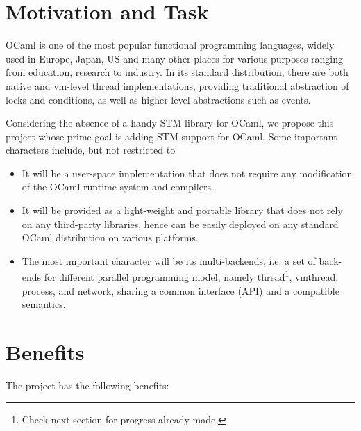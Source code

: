 \documentclass{article}
\begin{document}
\section{Motivation and Task}

OCaml \cite{OCaml} is one of the most popular functional programming languages,
widely used in Europe, Japan, US and many other places for various purposes
ranging from education, research to industry. In its standard distribution,
there are both native and vm-level thread implementations, providing
traditional abstraction of locks and conditions, as well as higher-level
abstractions such as events. 

Considering the absence of a handy STM library for OCaml, we propose this
project whose prime goal is adding STM support for OCaml. Some important
characters include, but not restricted to

\begin{itemize}
  \item It will be a user-space implementation that does not require any
    modification of the OCaml runtime system and compilers.
  \item It will be provided as a light-weight and portable library that does
    not rely on any third-party libraries, hence can be easily deployed on
    any standard OCaml distribution on various platforms.
  \item The most important character will be its multi-backends, i.e. a set of
    back-ends for different parallel programming model, namely
    thread\footnote{Check next section for progress already made.}, vmthread,
    process, and network, sharing a common interface (API) and a compatible
    semantics.
\end{itemize}


\section{Benefits}

The project has the following benefits:
\end{document}
